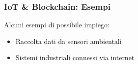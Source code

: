 \begin{frame}
 \frametitle{IoT \& Blockchain: Esempi}

 Alcuni esempi di possibile impiego:
 \begin{itemize}
  \item<1-> Raccolta dati da sensori ambientali
  \item<2-> Sistemi industriali connessi via internet
 \end{itemize}

\end{frame}

%
%
%
